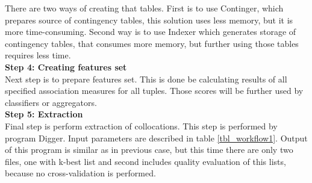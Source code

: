 There are two ways of creating that tables. First is to use Continger, which prepares source of contingency tables, 
this solution uses less memory, but it is more time-consuming. Second way is to use Indexer which generates storage of contingency tables, 
that consumes more memory, but further using those tables requires less time.
\\ \textbf{Step 4: Creating features set}\\
Next step is to prepare features set. This is done be calculating results of all specified association measures for all tuples. 
Those scores will be further used by classifiers or aggregators.
\\ \textbf{Step 5: Extraction}\\
Final step is perform extraction of collocations. This step is performed by program Digger. Input parameters are described 
in table \ref{tbl_workflow1}. Output of this program is similar as in previous case, but this time there are only two files, 
one with k-best list and second includes quality evaluation of this lists, because no cross-validation is performed.

